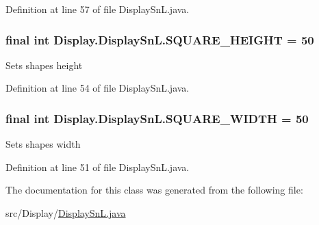 Definition at line 57 of file Display\+Sn\+L.\+java.

\hypertarget{class_display_1_1_display_sn_l_abcf7150eb19d813f34a1cdd3708d5c83}{}
\subsubsection[{S\+Q\+U\+A\+R\+E\+\_\+\+H\+E\+I\+G\+H\+T}]{\setlength{\rightskip}{0pt plus 5cm}final int Display.\+Display\+Sn\+L.\+S\+Q\+U\+A\+R\+E\+\_\+\+H\+E\+I\+G\+H\+T = 50\hspace{0.3cm}{\ttfamily [static]}}\label{class_display_1_1_display_sn_l_abcf7150eb19d813f34a1cdd3708d5c83}
Sets shape\textquotesingle{}s height 

Definition at line 54 of file Display\+Sn\+L.\+java.

\hypertarget{class_display_1_1_display_sn_l_acac8d594916c09aae69657f94c3e766d}{}
\subsubsection[{S\+Q\+U\+A\+R\+E\+\_\+\+W\+I\+D\+T\+H}]{\setlength{\rightskip}{0pt plus 5cm}final int Display.\+Display\+Sn\+L.\+S\+Q\+U\+A\+R\+E\+\_\+\+W\+I\+D\+T\+H = 50\hspace{0.3cm}{\ttfamily [static]}}\label{class_display_1_1_display_sn_l_acac8d594916c09aae69657f94c3e766d}
Sets shape\textquotesingle{}s width 

Definition at line 51 of file Display\+Sn\+L.\+java.



The documentation for this class was generated from the following file\+:\begin{DoxyCompactItemize}
\item 
src/\+Display/\hyperlink{_display_sn_l_8java}{Display\+Sn\+L.\+java}\end{DoxyCompactItemize}
